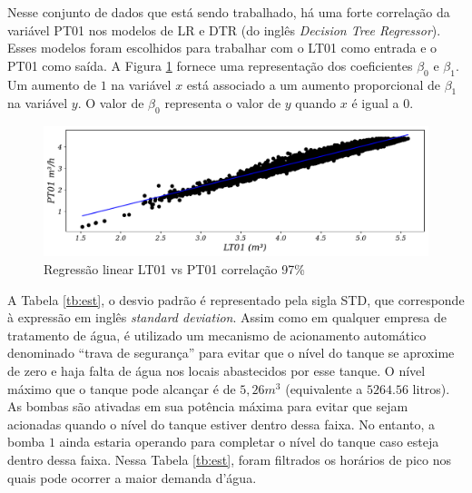 Nesse conjunto de dados que está sendo trabalhado, há uma forte correlação da variável PT01 nos modelos de LR e DTR (do inglês \textit{Decision Tree Regressor}). Esses modelos foram escolhidos para trabalhar com o LT01 como entrada e o PT01 como saída. A Figura \ref{fig:lr-lt01-m3} fornece uma representação dos coeficientes $\beta_0$ e $\beta_1$. Um aumento de $1$ na variável $x$ está associado a um aumento proporcional de $\beta_1$ na variável $y$. O valor de $\beta_0$ representa o valor de $y$ quando $x$ é igual a $0$.

\begin{figure}[!htb]
	\centering
	\caption{Regressão linear LT01 vs PT01 correlação 97\%}
	\label{fig:lr-lt01-m3}
	\includegraphics[width=0.7\linewidth]{Resultados/Figuras/LR}
	
	
\end{figure}








A Tabela \ref{tb:est}, o desvio padrão é representado pela sigla STD, que corresponde à expressão em inglês \textit{standard deviation}. Assim como em qualquer empresa de tratamento de água, é utilizado um mecanismo de acionamento automático denominado ``trava de segurança'' para evitar que o nível do tanque se aproxime de zero e haja falta de água nos locais abastecidos por esse tanque. O nível máximo que o tanque pode alcançar é de $5,26 m^3$ (equivalente a $5264.56$ litros). As bombas são ativadas em sua potência máxima para evitar que sejam acionadas quando o nível do tanque estiver dentro dessa faixa. No entanto, a bomba $1$ ainda estaria operando para completar o nível do tanque caso esteja dentro dessa faixa. Nessa Tabela \ref{tb:est}, foram filtrados os horários de pico nos quais pode ocorrer a maior demanda d'água.

